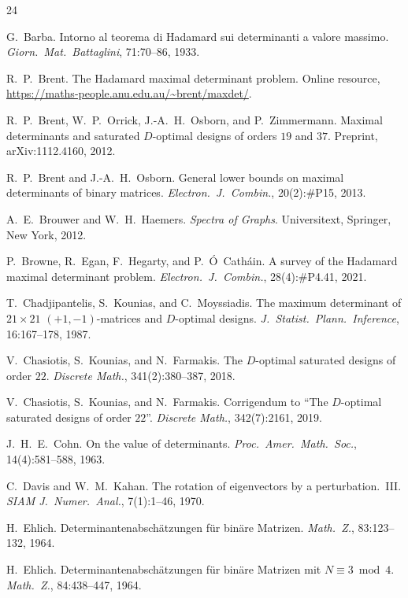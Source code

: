 \documentclass[11pt]{article}
\theoremstyle{remark}
\begin{document}
\begin{thebibliography}{24}
\setlength{\itemsep}{3pt plus 1pt}

G.~Barba.
Intorno al teorema di Hadamard sui determinanti a valore massimo.
\emph{Giorn.\ Mat.\ Battaglini}, 71:70--86, 1933.

R.~P.~Brent.
The Hadamard maximal determinant problem.
Online resource, \url{https://maths-people.anu.edu.au/~brent/maxdet/}.

R.~P.~Brent, W.~P.~Orrick, J.-A.~H.~Osborn, and P.~Zimmermann.
Maximal determinants and saturated $D$-optimal designs of orders $19$ and $37$.
Preprint, arXiv:1112.4160, 2012.

R.~P.~Brent and J.-A.~H.~Osborn.
General lower bounds on maximal determinants of binary matrices.
\emph{Electron.\ J.\ Combin.}, 20(2):\#P15, 2013.

A.~E.~Brouwer and W.~H.~Haemers.
\emph{Spectra of Graphs}.
Universitext, Springer, New York, 2012.

P.~Browne, R.~Egan, F.~Hegarty, and P.~\'O~Cath\'ain.
A survey of the Hadamard maximal determinant problem.
\emph{Electron.\ J.\ Combin.}, 28(4):\#P4.41, 2021.

T.~Chadjipantelis, S.~Kounias, and C.~Moyssiadis.
The maximum determinant of $21 \times 21$ $(+1, -1)$-matrices and $D$-optimal designs.
\emph{J.\ Statist.\ Plann.\ Inference}, 16:167--178, 1987.

V.~Chasiotis, S.~Kounias, and N.~Farmakis.
The $D$-optimal saturated designs of order $22$.
\emph{Discrete Math.}, 341(2):380--387, 2018.

V.~Chasiotis, S.~Kounias, and N.~Farmakis.
Corrigendum to ``The $D$-optimal saturated designs of order $22$''.
\emph{Discrete Math.}, 342(7):2161, 2019.

J.~H.~E.~Cohn.
On the value of determinants.
\emph{Proc.\ Amer.\ Math.\ Soc.}, 14(4):581--588, 1963.

C.~Davis and W.~M.~Kahan.
The rotation of eigenvectors by a perturbation.~III.
\emph{SIAM J.\ Numer.\ Anal.}, 7(1):1--46, 1970.

H.~Ehlich.
Determinantenabsch\"atzungen f\"ur bin\"are Matrizen.
\emph{Math.\ Z.}, 83:123--132, 1964.

H.~Ehlich.
Determinantenabsch\"atzungen f\"ur bin\"are Matrizen mit $N \equiv 3 \bmod 4$.
\emph{Math.\ Z.}, 84:438--447, 1964.


\end{thebibliography}
\end{document}
